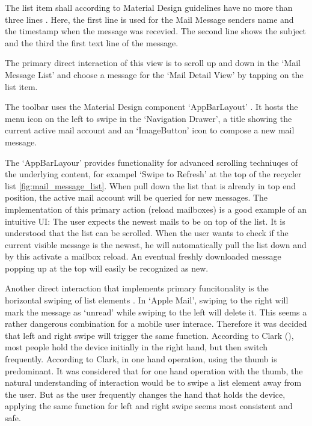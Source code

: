 \documentclass[a4paper,11pt,twoside]{article}
\begin{document}
The list item shall according to Material Design guidelines have no more
than  three lines \cite{material_lists}. Here, the first line is used for the
Mail Message senders name and the timestamp when the message was recevied. The
second line shows the subject and the third the first text line of the message.

The primary direct interaction of this view is to scroll up and down in the
`Mail Message List' and choose a message for the `Mail Detail View' by tapping
on the list item.

The toolbar uses the Material Design component `AppBarLayout'
\cite{appbar_layout}. It hosts the menu icon on the left to swipe in the
`Navigation Drawer', a title showing the current active mail account and an
`ImageButton' icon to compose a new mail message.

The `AppBarLayour' provides functionality for advanced scrolling
techniuqes of the underlying content, for exampel `Swipe to Refresh' at
the top of the recycler list \ref{fig:mail_message_list}.
When pull down the list that is already in top end
position, the active mail account will be queried for new messages. The
implementation of this primary action (reload mailboxes) is a good example
of an intuitive UI: The user expects the newest mails to be on top of the list.
It is understood that the list can be scrolled. When the user wants to check if
the current visible message is the newest, he will automatically pull the list
down and by this activate a mailbox reload. An eventual freshly downloaded
message popping up at the top will easily be recognized as new.

Another direct interaction that implements primary funcitonality is the
horizontal swiping of list elements \cite['Leave-behinds']{material_list_controls}.
In `Apple Mail', swiping to the right will
mark the message as `unread' while swiping to the left will delete it. This seems
a rather dangerous combination for a mobile user interace. Therefore it was
decided that left and right swipe will trigger the
same function. According to Clark (\cite[chapter1, `Hold the
phone']{clark2015}), most people hold the device initially in the right hand,
but then switch frequently. According to Clark, in one hand operation, using the
thumb is predominant. It was considered  that for one hand operation with the
thumb, the natural understanding of interaction would be to swipe a list element
away from the user. But as the user frequently changes the hand that holds the
device, applying the same function for left and right swipe seems most
consistent and safe.
\end{document}
